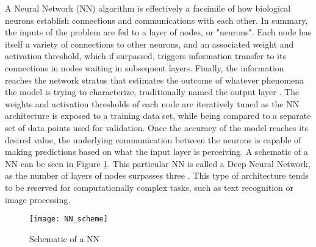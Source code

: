 \documentclass[main.tex]{subfiles}
\begin{document}
A Neural Network (NN) algorithm is effectively a facsimile of how biological neurons establish connections and communications with each other. In summary, the inputs of the problem are fed to a layer of nodes, or "neurons". Each node has itself a variety of connections to other neurons, and an associated weight and activation threshold, which if surpassed, triggers information transfer to its connections in nodes waiting in subsequent layers. Finally, the information reaches the network stratus that estimates the outcome of whatever phenomena the model is trying to characterize, traditionally named the output layer \cite {Chollet2018, IBMCloudEducation2020, Geron2019}. The weights and activation thresholds of each node are iteratively tuned as the NN architecture is exposed to a training data set, while being compared to a separate set of data points used for validation. Once the accuracy of the model reaches its desired value, the underlying communication between the neurons is capable of making predictions based on what the input layer is perceiving. A schematic of a NN can be seen in Figure \ref{fig:NN}. This particular NN is called a Deep Neural Network, as the number of layers of nodes surpasses three \cite{IBMCloudEducation2020}. This type of architecture tends to be reserved for computationally complex tasks, such as text recognition or image processing.  

\begin{figure}[!htbp]
	\center
	\texttt{[image: NN\_scheme]}
	\caption{Schematic of a NN \cite{IBMCloudEducation2020}} \label{fig:NN}
\end{figure}
\end{document}
